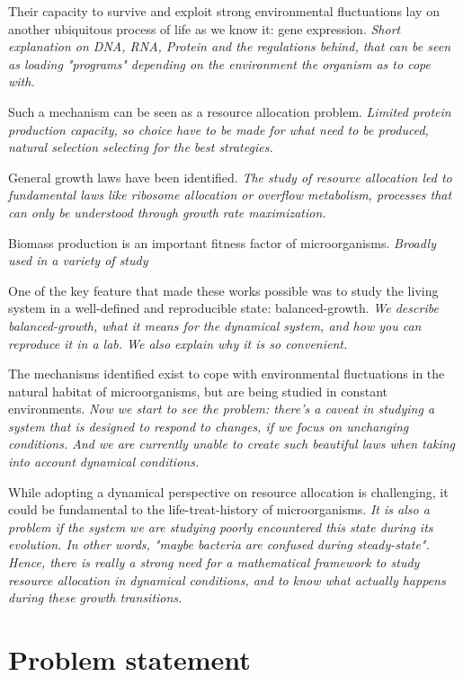 Their capacity to survive and exploit strong environmental fluctuations lay on another ubiquitous process of life as we know it: gene expression.
\textit{Short explanation on DNA, RNA, Protein and the regulations behind, that can be seen as loading "programs" depending on the environment the organism as to cope with.}

Such a mechanism can be seen as a resource allocation problem.
\textit{Limited protein production capacity, so choice have to be made for what need to be produced, natural selection selecting for the best strategies.}

General growth laws have been identified.
\textit{The study of resource allocation led to fundamental laws like ribosome allocation or overflow metabolism, processes that can only be understood through growth rate maximization.}

Biomass production is an important fitness factor of microorganisms.
\textit{Broadly used in a variety of study}

One of the key feature that made these works possible was to study the living system in a well-defined and reproducible state: balanced-growth.
\textit{We describe balanced-growth, what it means for the dynamical system, and how you can reproduce it in a lab.
We also explain why it is so convenient.}

The mechanisms identified exist to cope with environmental fluctuations in the natural habitat of microorganisms, but are being studied in constant environments.
\textit{Now we start to see the problem: there's a caveat in studying a system that is designed to respond to changes, if we focus on unchanging conditions.
And we are currently unable to create such beautiful laws when taking into account dynamical conditions.}

While adopting a dynamical perspective on resource allocation is challenging, it could be fundamental to the life-treat-history of microorganisms.
\textit{It is also a problem if the system we are studying poorly encountered this state during its evolution.
In other words, "maybe bacteria are confused during steady-state".
Hence, there is really a strong need for a mathematical framework to study resource allocation in dynamical conditions, and to know what actually happens during these growth transitions.}

\section{Problem statement}

